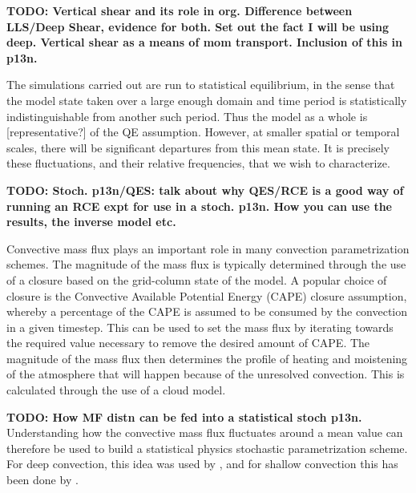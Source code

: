 \documentclass[11pt,a4paper]{article}
\newcommand\todo[1]{\textbf{TODO: #1}}
\begin{document}
\todo{Vertical shear and its role in org. Difference between LLS/Deep Shear, evidence for both. Set out the fact I will be using deep. Vertical shear as a means of mom transport. Inclusion of this in p13n.}

The simulations carried out are run to statistical equilibrium, in the sense that the model state taken over a large enough domain and time period is statistically indistinguishable from another such period. Thus the model as a whole is [representative?] of the QE assumption. However, at smaller spatial or temporal scales, there will be significant departures from this mean state. It is precisely these fluctuations, and their relative frequencies, that we wish to characterize.

\todo{Stoch. p13n/QES: talk about why QES/RCE is a good way of running an RCE expt for use in a stoch. p13n. How you can use the results, the inverse model etc.}

Convective mass flux plays an important role in many convection parametrization schemes. The magnitude of the mass flux is typically determined through the use of a closure based on the grid-column state of the model. A popular choice of closure is the Convective Available Potential Energy (CAPE) closure assumption, whereby a percentage of the CAPE is assumed to be consumed by the convection in a given timestep. This can be used to set the mass flux by iterating towards the required value necessary to remove the desired amount of CAPE. The magnitude of the mass flux then determines the profile of heating and moistening of the atmosphere that will happen because of the unresolved convection. This is calculated through the use of a cloud model.

\todo{How MF distn can be fed into a statistical stoch p13n.}
Understanding how the convective mass flux fluctuates around a mean value can therefore be used to build a statistical physics stochastic parametrization scheme. For deep convection, this idea was used by \cite{PC2008}, and for shallow convection this has been done by \cite{sakradzija2016stochastic}. 

\end{document}
